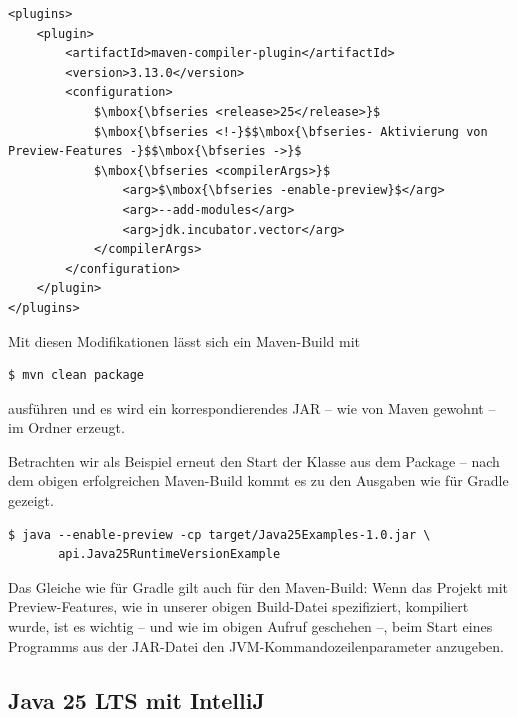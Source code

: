 \lstset{mathescape=true}
\begin{lstlisting}
<plugins>
	<plugin>
		<artifactId>maven-compiler-plugin</artifactId>
		<version>3.13.0</version>
		<configuration>
			$\mbox{\bfseries <release>25</release>}$
			$\mbox{\bfseries <!-}$$\mbox{\bfseries- Aktivierung von Preview-Features -}$$\mbox{\bfseries ->}$
			$\mbox{\bfseries <compilerArgs>}$
                <arg>$\mbox{\bfseries -enable-preview}$</arg>
                <arg>--add-modules</arg>
                <arg>jdk.incubator.vector</arg>
            </compilerArgs>
		</configuration>
	</plugin>
</plugins>
\end{lstlisting}
\lstset{mathescape=false}


\noindent
Mit diesen Modifikationen lässt sich ein Maven-Build mit


\begin{lstlisting}
$ mvn clean package
\end{lstlisting}


ausführen und es wird ein korrespondierendes JAR  -- wie von Maven gewohnt -- im
Ordner  erzeugt.


Betrachten wir als Beispiel erneut den Start der Klasse  aus dem Package
 -- nach dem obigen erfolgreichen Maven-Build kommt es zu den Ausgaben wie für Gradle gezeigt.


\begin{lstlisting}
$ java --enable-preview -cp target/Java25Examples-1.0.jar \
       api.Java25RuntimeVersionExample
\end{lstlisting}


Das Gleiche wie für Gradle gilt auch für den Maven-Build:
Wenn das Projekt mit Preview-Features, wie in unserer obigen Build-Datei spezifiziert,
kompiliert wurde, ist  es wichtig -- und wie im obigen Aufruf geschehen --,
beim Start eines Programms aus der JAR-Datei
den JVM-Kommandozeilenparameter \code{-} anzugeben.








\subsection{Java 25 LTS mit IntelliJ}


